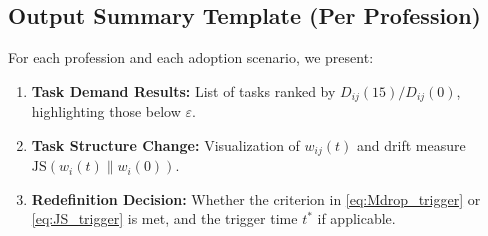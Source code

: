 \subsection{Output Summary Template (Per Profession)}
\label{sec:output_template}
For each profession and each adoption scenario, we present:
\begin{enumerate}
  \item \textbf{Task Demand Results:} List of tasks ranked by $D_{ij}(15)/D_{ij}(0)$, highlighting those below $\varepsilon$.
  \item \textbf{Task Structure Change:} Visualization of $w_{ij}(t)$ and drift measure $\mathrm{JS}(w_i(t)\|w_i(0))$.
  \item \textbf{Redefinition Decision:} Whether the criterion in \eqref{eq:Mdrop_trigger} or \eqref{eq:JS_trigger} is met, and the trigger time $t^*$ if applicable.
\end{enumerate}
